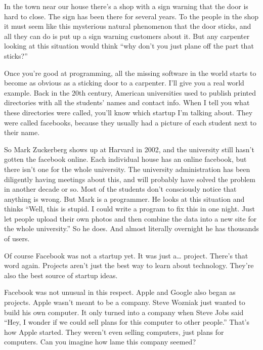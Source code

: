 In the town near our house there's a shop with a sign warning that the
door is hard to close. The sign has been there for several years. To the
people in the shop it must seem like this mysterious natural phenomenon
that the door sticks, and all they can do is put up a sign warning
customers about it. But any carpenter looking at this situation would
think ``why don't you just plane off the part that sticks?''

Once you're good at programming, all the missing software in the world
starts to become as obvious as a sticking door to a carpenter. I'll give
you a real world example. Back in the 20th century, American
universities used to publish printed directories with all the students'
names and contact info. When I tell you what these directories were
called, you'll know which startup I'm talking about. They were called
facebooks, because they usually had a picture of each student next to
their name.

So Mark Zuckerberg shows up at Harvard in 2002, and the university still
hasn't gotten the facebook online. Each individual house has an online
facebook, but there isn't one for the whole university. The university
administration has been diligently having meetings about this, and will
probably have solved the problem in another decade or so. Most of the
students don't consciously notice that anything is wrong. But Mark is a
programmer. He looks at this situation and thinks ``Well, this is
stupid. I could write a program to fix this in one night. Just let
people upload their own photos and then combine the data into a new site
for the whole university.'' So he does. And almost literally overnight
he has thousands of users.

Of course Facebook was not a startup yet. It was just a\ldots{} project.
There's that word again. Projects aren't just the best way to learn
about technology. They're also the best source of startup ideas.

Facebook was not unusual in this respect. Apple and Google also began as
projects. Apple wasn't meant to be a company. Steve Wozniak just wanted
to build his own computer. It only turned into a company when Steve Jobs
said ``Hey, I wonder if we could sell plans for this computer to other
people.'' That's how Apple started. They weren't even selling computers,
just plans for computers. Can you imagine how lame this company seemed?

